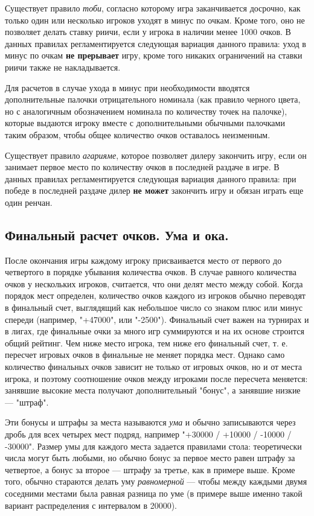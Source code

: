 Существует правило \textit{тоби}, согласно которому игра заканчивается досрочно, как только один или несколько игроков уходят в минус по очкам. Кроме того, оно не позволяет делать ставку риичи, если у игрока в наличии менее 1000 очков. В данных правилах регламентируется следующая вариация данного правила: уход в минус по очкам \textbf{не прерывает} игру, кроме того никаких ограничений на ставки риичи также не накладывается.

Для расчетов в случае ухода в минус при необходимости вводятся дополнительные палочки отрицательного номинала (как правило черного цвета, но с аналогичным обозначением номинала по количеству точек на палочке), которые выдаются игроку вместе с дополнительными обычными палочками таким образом, чтобы общее количество очков оставалось неизменным.

Существует правило \textit{агарияме}, которое позволяет дилеру закончить игру, если он занимает первое место по количеству очков в последней раздаче в игре. В данных правилах регламентируется следующая вариация данного правила: при победе в последней раздаче дилер \textbf{не может} закончить игру и обязан играть еще один ренчан.

\subsection{Финальный расчет очков. Ума и ока.}

После окончания игры каждому игроку присваивается место от первого до четвертого в порядке убывания количества очков. В случае равного количества очков у нескольких игроков, считается, что они делят место между собой. Когда порядок мест определен, количество очков каждого из игроков обычно переводят в финальный счет, выглядящий как небольшое число со знаком плюс или минус спереди (например, "+47000", или "-2500"). Финальный счет важен на турнирах и в лигах, где финальные очки за много игр суммируются и на их основе строится общий рейтинг. Чем ниже место игрока, тем ниже его финальный счет, т. е. пересчет игровых очков в финальные не меняет порядка мест. Однако само количество финальных очков зависит не только от игровых очков, но и от места игрока, и поэтому соотношение очков между игроками после пересчета меняется: занявшие высокие места получают дополнительный "бонус", а занявшие низкие --- "штраф".

Эти бонусы и штрафы за места называются \textit{ума} и обычно записываются через дробь для всех четырех мест подряд, например "+30000 / +10000 / -10000 / -30000". Размер умы для каждого места задается правилами стола: теоретически числа могут быть любыми, но обычно бонус за первое место равен штрафу за четвертое, а бонус за второе --- штрафу за третье, как в примере выше. Кроме того, обычно стараются делать уму \textit{равномерной} --- чтобы между каждыми двумя соседними местами была равная разница по уме (в примере выше именно такой вариант распределения с интервалом в 20000). 

